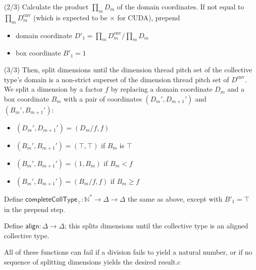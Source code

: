 \filbreak
(2/3) Calculate the product $\prod_m D_m$ of the domain coordinates.
If not equal to $\prod_m D^\text{env}_m$ (which is expected to be  $\times$  for CUDA), prepend
\filbreak
\begin{itemize}
  \item domain coordinate $D'_1 = \prod_m D_m^\text{env} / \prod_m D_m$
  \filbreak
  \item box coordinate $B'_1 = 1$
\end{itemize}
\filbreak
(3/3) Then, split dimensions until the dimension thread pitch set of the collective type's domain is a non-strict superset of the dimension thread pitch set of $D^\text{env}$.
We split a dimension by a factor $f$ by replacing a domain coordinate $D_m$ and a box coordinate $B_m$ with a pair of coordinates $(D_m', D_{m+1}')$ and $(B_m', B_{m+1}')$:
\begin{itemize}
  \item $(D_m', D_{m+1}') = (D_m / f, f)$
  \filbreak
  \item $(B_m', B_{m+1}') = (\top, \top)$ if $B_m$ is $\top$
  \filbreak
  \item $(B_m', B_{m+1}') = (1, B_m)$ if $B_m < f$
  \filbreak
  \item $(B_m', B_{m+1}') = (B_m / f, f)$ if $B_m \ge f$
\end{itemize}
\filbreak
Define  $\mathsf{completeCollType}_\top: \mathbb{N}^* \to \Delta \to \Delta$
the same as above, except with $B'_1 = \top$ in the prepend step.

\filbreak
Define $\mathsf{align}: \Delta \to \Delta$; this splits dimensions until the collective type is an aligned collective type.

\filbreak
All of these functions can fail if a division fails to yield a natural number, or if no sequence of splitting dimensions yields the desired result.c

\filbreak
{}

